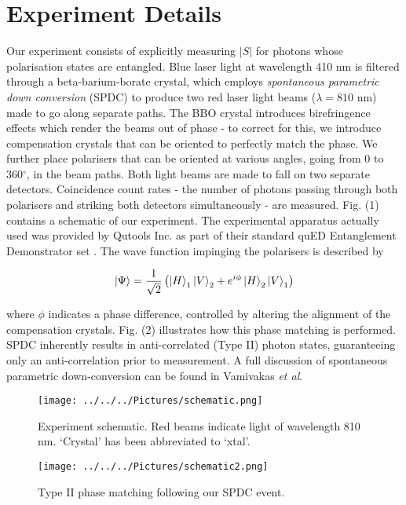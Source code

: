 \documentclass[aps,prl,nofootinbib,twocolumn,superscriptaddress,groupedaddress]{revtex4}  %
\begin{document}
\section{Experiment Details}
Our experiment consists of explicitly measuring $\lvert S \rvert$ for photons whose polarisation states are entangled. Blue laser light at wavelength 410 nm is filtered through a beta-barium-borate crystal, which employs \textit{spontaneous parametric down conversion} (SPDC) to produce two red laser light beams ($\lambda = 810$ nm) made to go along separate paths. The BBO crystal introduces birefringence effects which render the beams out of phase - to correct for this, we introduce compensation crystals that can be oriented to perfectly match the phase. We further place   polarisers that can be oriented at various angles, going from 0 to 360$^{\circ}$, in the beam paths. Both light beams are made to fall on two separate detectors. Coincidence count rates - the number of photons passing through both polarisers and striking both detectors simultaneously - are measured. Fig. (1) contains a schematic of our experiment. The experimental apparatus actually used was provided by Qutools Inc. as part of their standard quED Entanglement Demonstrator set \cite{qued}. The wave function impinging the polarisers is described by

\begin{equation}
\ket{\Psi} = \dfrac{1}{\sqrt{2}}\left(\ket{H}_{1}\ket{V}_{2} + e^{i\phi} \ket{H}_{2}\ket{V}_{1}\right)
\end{equation}

where $\phi$ indicates a phase difference, controlled by altering the alignment of the compensation crystals. Fig. (2) illustrates how this phase matching is performed. SPDC inherently results in anti-correlated (Type II) photon states, guaranteeing only an anti-correlation prior to measurement. A full discussion of spontaneous parametric down-conversion can be found in Vamivakas \textit{et al}\cite{spdc}.

\begin{figure}[t]
\texttt{[image: ../../../Pictures/schematic.png]}
\caption{Experiment schematic\cite{qued}. Red beams indicate light of wavelength 810 nm. `Crystal' has been abbreviated to `xtal'.}
\end{figure}

\begin{figure}[b]
\texttt{[image: ../../../Pictures/schematic2.png]}
\caption{Type II phase matching following our SPDC event.}
\end{figure}
\end{document}

